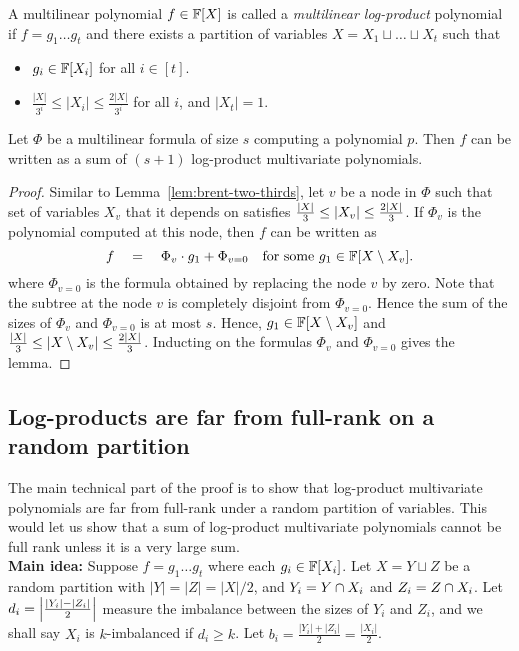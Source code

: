 \documentclass[12pt]{report}
\begin{document}
\begin{definition}\label{defn:mult-logproduct}
  A multilinear polynomial $f\in \mathbb{F}[X]$ is called a \emph{multilinear log-product} polynomial if $f = g_1\dots g_t$ and there exists a partition of variables $X = X_1 \sqcup \dots \sqcup X_t$ such that
  \begin{itemize}
  \item $g_i \in \mathbb{F}[X_i]$ for all $i \in [t]$.
  \item $\frac{|X|}{3^i} \leq |X_i| \leq \frac{2|X|}{3^i}$ for all
    $i$, and $|X_t| = 1$.
  \end{itemize}
\end{definition}

\begin{lemma}\label{lem:mult-logproduct}
  Let $\Phi$ be a multilinear formula of size $s$ computing a polynomial $p$. Then $f$ can be written as a sum of $(s+1)$ log-product multivariate polynomials.
\end{lemma}
\begin{proof}
  Similar to Lemma~\ref{lem:brent-two-thirds}, let $v$ be a node in $\Phi$ such that set of variables $X_v$ that it depends on satisfies $\frac{|X|}{3} \leq \left|X_v\right| \leq \frac{2|X|}{3}$. If $\Phi_v$ is the polynomial computed at this node, then $f$ can be written as
  $$
  f \quad = \quad \Phi_v \cdot g_1 + \Phi_{v=0} \quad\text{for some $g_1 \in \mathbb{F}[X\setminus X_v]$}.
  $$
  where $\Phi_{v=0}$ is the formula obtained by replacing the node $v$ by zero. Note that the subtree at the node $v$ is completely disjoint from $\Phi_{v=0}$. Hence the sum of the sizes of $\Phi_v$ and $\Phi_{v=0}$ is at most $s$. Hence, $g_1 \in \mathbb{F}[X\setminus X_v]$ and $\frac{|X|}{3} \leq \left|X \setminus X_v\right| \leq \frac{2|X|}{3}$. Inducting on the formulas $\Phi_v$ and $\Phi_{v=0}$ gives the lemma.
\end{proof}

\subsection{Log-products are far from full-rank on a random
  partition}

The main technical part of the proof is to show that log-product multivariate polynomials are far from full-rank under a random partition of variables. This would let us show that a sum of log-product multivariate polynomials cannot be full rank unless it is a very large sum.\\

{\bf Main idea: } Suppose $f = g_1 \dots g_t$ where each $g_i \in \mathbb{F}[X_i]$. Let $X = Y \sqcup Z$ be a random partition with $|Y| = |Z| = |X|/2$, and $Y_i = Y \cap X_i$ and $Z_i = Z \cap X_i$. Let $d_i = \left|\frac{|Y_i| - |Z_i|}{2}\right|$ measure the imbalance between the sizes of $Y_i$ and $Z_i$, and we shall say $X_i$ is $k$-imbalanced if $d_i \geq k$. Let $b_i = \frac{|Y_i| + |Z_i|}{2} = \frac{|X_i|}{2}$.
\end{document}
